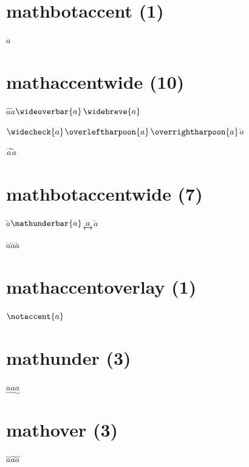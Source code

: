 \documentclass{article}
\begin{document}
\section*{mathbotaccent (1)}

$\threeunderdot{a}$\par

\section*{mathaccentwide (10)}

$\widehat{a}$\quad{}$\widetilde{a}$\quad{}$\wideoverbar{a}$\quad{}$\widebreve{a}$\quad{}\par
$\widecheck{a}$\quad{}$\overleftharpoon{a}$\quad{}$\overrightharpoon{a}$\quad{}$\overleftarrow{a}$\quad{}\par
$\overrightarrow{a}$\quad{}$\overleftrightarrow{a}$\par

\section*{mathbotaccentwide (7)}

$\wideutilde{a}$\quad{}$\mathunderbar{a}$\quad{}$\underleftrightarrow{a}$\quad{}$\underrightharpoondown{a}$\quad{}\par
$\underleftharpoondown{a}$\quad{}$\underleftarrow{a}$\quad{}$\underrightarrow{a}$\par

\section*{mathaccentoverlay (1)}

$\notaccent{a}$\par

\section*{mathunder (3)}

$\underbracket{a}$\quad{}$\underparen{a}$\quad{}$\underbrace{a}$\par

\section*{mathover (3)}

$\overbracket{a}$\quad{}$\overparen{a}$\quad{}$\overbrace{a}$\par
\end{document}
